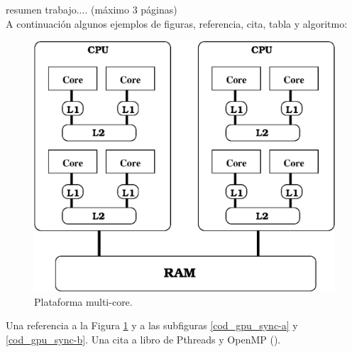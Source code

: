 \documentclass[letterpaper, 12pt]{article}
\begin{document}
resumen trabajo.... (máximo 3 páginas)\\

A continuación algunos ejemplos de figuras, referencia, cita, tabla y algoritmo:\\

\begin{figure}
\begin{center}
   \includegraphics[scale=0.5]{fig/plataforma.eps}
\end{center}
\caption{\label{fig:plataforma}Plataforma multi-core.}
\end{figure}


Una referencia a la Figura \ref{fig:plataforma} y a las subfiguras \ref{cod_gpu_sync-a} y \ref{cod_gpu_sync-b}.
Una cita a libro de Pthreads \cite{libroPthreads}
y OpenMP (\cite{libroOpenMP}).
\end{document}

